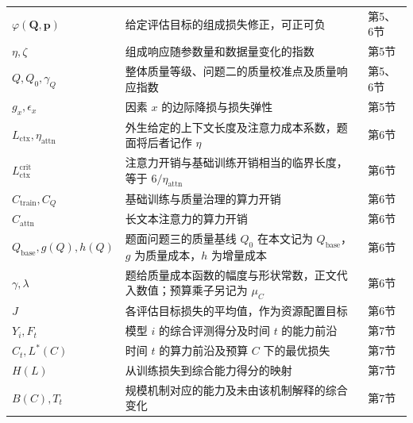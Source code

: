 \documentclass[bwprint]{gmcmthesis}
\begin{document}
{\begin{longtable}{@{}P{2.8cm}P{8.7cm}C{2.0cm}@{}}
    $\varphi(\mathbf Q,\mathbf p)$          & 给定评估目标的组成损失修正，可正可负                                             & 第5、6节  \\
    $\eta,\zeta$                            & 组成响应随参数量和数据量变化的指数                                              & 第5节    \\
    $Q,Q_0,\gamma_Q$                        & 整体质量等级、问题二的质量校准点及质量响应指数                                        & 第5、6节  \\
    $g_x,\epsilon_x$                        & 因素 $x$ 的边际降损与损失弹性                                              & 第5节    \\
    \midrule
    $L_{\mathrm{ctx}},\eta_{\mathrm{attn}}$ & 外生给定的上下文长度及注意力成本系数，题面将后者记作 $\eta$                              & 第6节    \\
    $L_{\mathrm{ctx}}^{\mathrm{crit}}$      & 注意力开销与基础训练开销相当的临界长度，等于 $6/\eta_{\mathrm{attn}}$                & 第6节    \\
    $C_{\mathrm{train}},C_Q$                & 基础训练与质量治理的算力开销                                                 & 第6节    \\
    $C_{\mathrm{attn}}$                     & 长文本注意力的算力开销                                                    & 第6节    \\
    $Q_{\mathrm{base}},g(Q),h(Q)$           & 题面问题三的质量基线 $Q_0$ 在本文记为 $Q_{\mathrm{base}}$，$g$ 为质量成本，$h$ 为增量成本 & 第6节    \\
    $\gamma,\lambda$                        & 题给质量成本函数的幅度与形状常数，正文代入数值；预算乘子另记为 $\mu_C$                        & 第6节    \\
    $J$                                     & 各评估目标损失的平均值，作为资源配置目标                                           & 第6节    \\
    \midrule
    $Y_i,F_t$                               & 模型 $i$ 的综合评测得分及时间 $t$ 的能力前沿                                    & 第7节    \\
    $C_t,L^*(C)$                            & 时间 $t$ 的算力前沿及预算 $C$ 下的最优损失                                     & 第7节    \\
    $H(L)$                                  & 从训练损失到综合能力得分的映射                                                & 第7节    \\
    $B(C),T_t$                              & 规模机制对应的能力及未由该机制解释的综合变化                                         & 第7节    \\
\end{longtable}
}
\end{document}
